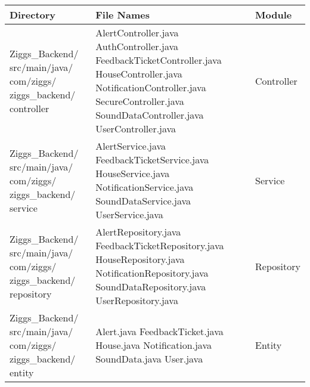 \documentclass[conference]{IEEEtran}
\begin{document}
\begin{table}[H]
\centering
\renewcommand{\arraystretch}{1.5}
\begin{tabular}{|m{2.6cm}|m{3.5cm}|m{1.6cm}|}
\hline
\textbf{Directory} & \textbf{File Names} & \textbf{Module} \\ \hline

Ziggs\_Backend/ src/main/java/ com/ziggs/ ziggs\_backend/ controller & 
AlertController.java \newline 
AuthController.java \newline 
FeedbackTicketController.java \newline 
HouseController.java \newline
NotificationController.java \newline 
SecureController.java \newline 
SoundDataController.java \newline 
UserController.java & 
Controller \\ \hline

Ziggs\_Backend/ src/main/java/ com/ziggs/ ziggs\_backend/ service & 
AlertService.java \newline 
FeedbackTicketService.java \newline 
HouseService.java \newline 
NotificationService.java \newline 
SoundDataService.java\newline 
UserService.java & 
Service \\ \hline

Ziggs\_Backend/ src/main/java/ com/ziggs/ ziggs\_backend/ repository & 
AlertRepository.java \newline 
FeedbackTicketRepository.java \newline 
HouseRepository.java \newline 
NotificationRepository.java \newline 
SoundDataRepository.java \newline 
UserRepository.java  & 
Repository \\ \hline

Ziggs\_Backend/ src/main/java/ com/ziggs/ ziggs\_backend/ entity & 
Alert.java \newline 
FeedbackTicket.java \newline 
House.java \newline
Notification.java \newline 
SoundData.java \newline
User.java & 
Entity \\ \hline


\end{tabular}
\end{table}
\end{document}

